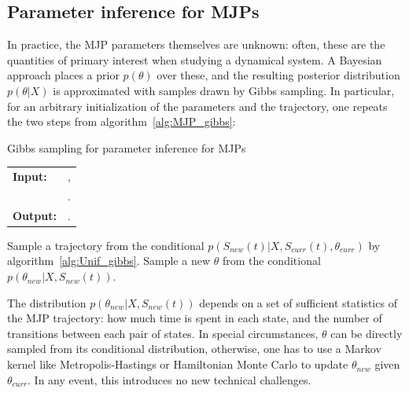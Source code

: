 \subsection{Parameter inference for MJPs}
In practice, the MJP parameters themselves are unknown: often,
these are the quantities of primary interest when studying a dynamical
system. A Bayesian approach
places a prior $p(\theta)$ over these, and the
resulting posterior distribution $p(\theta|X)$ is approximated
with samples drawn by Gibbs sampling. In particular, for an arbitrary 
initialization of the parameters and the trajectory, one repeats the
two steps from algorithm~\ref{alg:MJP_gibbs}:
\begin{algorithm}[H]
  \caption{Gibbs sampling for parameter inference for MJPs}
   \label{alg:MJP_gibbs}
  \begin{tabular}{l l}
   \textbf{Input:  } & \text{A set of partial and noisy observations $X$}, \\
                      & \text{The previous MJP path $S(t) = (S, T)$, the previous MJP parameters $\theta$}.\\ 
   \textbf{Output:  }& \text{A new MJP trajectory $\tilde{S} (t) = (\tilde{S}, \tilde{T})$, 
                            new MJP parameters $\tilde{\theta}$}.\\
   \hline
   \end{tabular}
   \begin{algorithmic}[1]
  \State  Sample a trajectory from the conditional 
  $p(S_{new}(t)|X,S_{curr}(t),\theta_{curr})$ by 
  algorithm~\ref{alg:Unif_gibbs}.
  \State Sample a new $\theta$ from the conditional 
    $p(\theta_{new}|X,S_{new}(t))$.
   \end{algorithmic}
\end{algorithm}
The distribution $p(\theta_{new}|X,S_{new}(t))$ depends on a set of sufficient statistics of the 
MJP trajectory: how
much time is spent in each state, and the number of transitions
between each pair of states. 
In special circumstances, $\theta$ can be directly sampled from its 
conditional distribution, otherwise, one has to use a Markov kernel like
Metropolis-Hastings or Hamiltonian Monte Carlo to update $\theta_{new}$ 
given $\theta_{curr}$. In any event, this introduces no new technical 
challenges.
